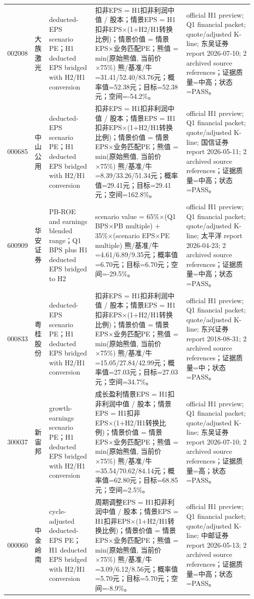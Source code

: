 \begin{longtable}{L{0.85cm}L{1.55cm}L{2.25cm}L{6.0cm}L{4.0cm}}
002008 & 大族激光 & deducted-EPS scenario PE；H1 deducted EPS bridged with H2/H1 conversion & 扣非EPS = H1扣非利润中值 / 股本；情景EPS = H1扣非EPS×(1+H2/H1转换比例)；情景价值 = 情景EPS×业务匹配PE；熊值 = min(原始熊值, 当前价×75\%) 熊/基准/牛=31.41/52.40/83.76元；概率值=52.38元；目标=52.38元；空间=-54.2\%。 & official H1 preview; Q1 financial packet; quote/adjusted K-line; 东吴证券 report 2026-07-10; 2 archived source references；证据质量=中高；状态=PASS。 \\
000685 & 中山公用 & deducted-EPS scenario PE；H1 deducted EPS bridged with H2/H1 conversion & 扣非EPS = H1扣非利润中值 / 股本；情景EPS = H1扣非EPS×(1+H2/H1转换比例)；情景价值 = 情景EPS×业务匹配PE；熊值 = min(原始熊值, 当前价×75\%) 熊/基准/牛=8.39/33.26/51.34元；概率值=29.41元；目标=29.41元；空间=162.8\%。 & official H1 preview; Q1 financial packet; quote/adjusted K-line; 国信证券 report 2026-05-11; 2 archived source references；证据质量=中高；状态=PASS。 \\
600909 & 华安证券 & PB-ROE and earnings blended range；Q1 BPS plus H1 deducted EPS bridged to H2 & scenario value = 65\%×(Q1 BPS×PB multiple) + 35\%×(scenario EPS×PE multiple) 熊/基准/牛=4.61/6.89/9.35元；概率值=6.70元；目标=6.70元；空间=-29.5\%。 & official H1 preview; Q1 financial packet; quote/adjusted K-line; 太平洋 report 2026-04-23; 2 archived source references；证据质量=中高；状态=PASS。 \\
000833 & 粤桂股份 & deducted-EPS scenario PE；H1 deducted EPS bridged with H2/H1 conversion & 扣非EPS = H1扣非利润中值 / 股本；情景EPS = H1扣非EPS×(1+H2/H1转换比例)；情景价值 = 情景EPS×业务匹配PE；熊值 = min(原始熊值, 当前价×75\%) 熊/基准/牛=15.05/27.84/42.99元；概率值=27.03元；目标=27.03元；空间=34.7\%。 & official H1 preview; Q1 financial packet; quote/adjusted K-line; 东兴证券 report 2018-08-31; 2 archived source references；证据质量=中；状态=PASS。 \\
300037 & 新宙邦 & growth-earnings scenario PE；H1 deducted EPS bridged with H2/H1 conversion & 成长盈利情景EPS = H1扣非利润中值 / 股本；情景EPS = H1扣非EPS×(1+H2/H1转换比例)；情景价值 = 情景EPS×业务匹配PE；熊值 = min(原始熊值, 当前价×75\%) 熊/基准/牛=35.54/70.62/84.14元；概率值=62.80元；目标=68.85元；空间=2.5\%。 & official H1 preview; Q1 financial packet; quote/adjusted K-line; 东吴证券 report 2026-07-10; 2 archived source references；证据质量=高；状态=PASS。 \\
000060 & 中金岭南 & cycle-adjusted deducted-EPS PE；H1 deducted EPS bridged with H2/H1 conversion & 周期调整EPS = H1扣非利润中值 / 股本；情景EPS = H1扣非EPS×(1+H2/H1转换比例)；情景价值 = 情景EPS×业务匹配PE；熊值 = min(原始熊值, 当前价×75\%) 熊/基准/牛=3.09/6.12/8.56元；概率值=5.70元；目标=5.70元；空间=-8.9\%。 & official H1 preview; Q1 financial packet; quote/adjusted K-line; 中邮证券 report 2026-05-13; 2 archived source references；证据质量=中高；状态=PASS。 \\

\end{longtable}
